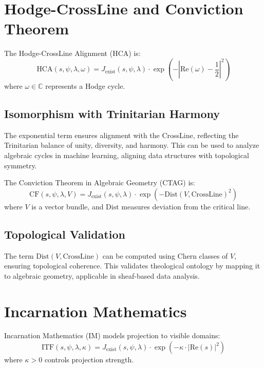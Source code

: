 \documentclass[12pt]{article}
\begin{document}
{{{\begin{onehalfspace}
\section{Hodge-CrossLine and Conviction Theorem}

\begin{definition}
The Hodge-CrossLine Alignment (HCA) is:
\[
\text{HCA}(s, \psi, \lambda, \omega) = J_{\text{exist}}(s, \psi, \lambda) \cdot \exp\left(-\left|\text{Re}(\omega) - \frac{1}{2}\right|^2\right)
\]
where \( \omega \in \mathbb{C} \) represents a Hodge cycle.
\end{definition}

\subsection*{Isomorphism with Trinitarian Harmony}
The exponential term ensures alignment with the CrossLine, reflecting the Trinitarian balance of unity, diversity, and harmony. This can be used to analyze algebraic cycles in machine learning, aligning data structures with topological symmetry.

\begin{definition}
The Conviction Theorem in Algebraic Geometry (CTAG) is:
\[
\text{CF}(s, \psi, \lambda, V) = J_{\text{exist}}(s, \psi, \lambda) \cdot \exp\left(-\text{Dist}(V, \text{CrossLine})^2\right)
\]
where \( V \) is a vector bundle, and \( \text{Dist} \) measures deviation from the critical line.
\end{definition}

\subsection*{Topological Validation}
The term \( \text{Dist}(V, \text{CrossLine}) \) can be computed using Chern classes of \( V \), ensuring topological coherence. This validates theological ontology by mapping it to algebraic geometry, applicable in sheaf-based data analysis.

\section{Incarnation Mathematics}

\begin{definition}
Incarnation Mathematics (IM) models projection to visible domains:
\[
\text{ITF}(s, \psi, \lambda, \kappa) = J_{\text{exist}}(s, \psi, \lambda) \cdot \exp\left(-\kappa \cdot |\text{Re}(s)|^2\right)
\]
where \( \kappa > 0 \) controls projection strength.
\end{definition}


\end{onehalfspace}}}}
\end{document}
